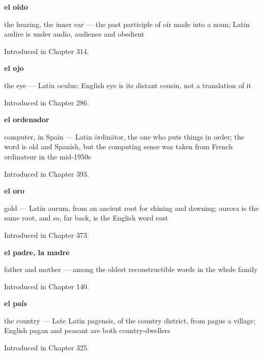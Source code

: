 \noindent\begin{minipage}[t]{\linewidth}
\raggedright
\textbf{el oído}\par
\small the hearing, the inner ear — the past participle of oír made into a noun; Latin audire is under audio, audience and obedient\par
\footnotesize Introduced in Chapter 314.
\end{minipage}\par\medskip

\noindent\begin{minipage}[t]{\linewidth}
\raggedright
\textbf{el ojo}\par
\small the eye — Latin oculus; English eye is its distant cousin, not a translation of it\par
\footnotesize Introduced in Chapter 286.
\end{minipage}\par\medskip

\noindent\begin{minipage}[t]{\linewidth}
\raggedright
\textbf{el ordenador}\par
\small computer, in Spain — Latin ōrdinātor, the one who puts things in order; the word is old and Spanish, but the computing sense was taken from French ordinateur in the mid-1950s\par
\footnotesize Introduced in Chapter 393.
\end{minipage}\par\medskip

\noindent\begin{minipage}[t]{\linewidth}
\raggedright
\textbf{el oro}\par
\small gold — Latin aurum, from an ancient root for shining and dawning; aurora is the same root, and so, far back, is the English word east\par
\footnotesize Introduced in Chapter 373.
\end{minipage}\par\medskip

\noindent\begin{minipage}[t]{\linewidth}
\raggedright
\textbf{el padre, la madre}\par
\small father and mother — among the oldest reconstructible words in the whole family\par
\footnotesize Introduced in Chapter 140.
\end{minipage}\par\medskip

\noindent\begin{minipage}[t]{\linewidth}
\raggedright
\textbf{el país}\par
\small the country — Late Latin pagensis, of the country district, from pagus a village; English pagan and peasant are both country-dwellers\par
\footnotesize Introduced in Chapter 325.
\end{minipage}\par\medskip

